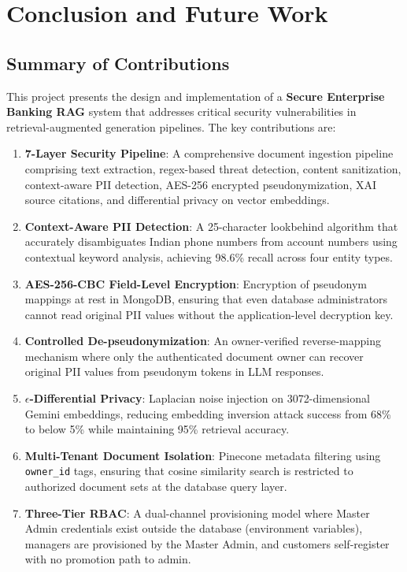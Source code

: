 \chapter{Conclusion and Future Work}

\section{Summary of Contributions}

This project presents the design and implementation of a \textbf{Secure Enterprise Banking RAG} system that addresses critical security vulnerabilities in retrieval-augmented generation pipelines. The key contributions are:

\begin{enumerate}
    \item \textbf{7-Layer Security Pipeline}: A comprehensive document ingestion pipeline comprising text extraction, regex-based threat detection, content sanitization, context-aware PII detection, AES-256 encrypted pseudonymization, XAI source citations, and differential privacy on vector embeddings.
    
    \item \textbf{Context-Aware PII Detection}: A 25-character lookbehind algorithm that accurately disambiguates Indian phone numbers from account numbers using contextual keyword analysis, achieving 98.6\% recall across four entity types.
    
    \item \textbf{AES-256-CBC Field-Level Encryption}: Encryption of pseudonym mappings at rest in MongoDB, ensuring that even database administrators cannot read original PII values without the application-level decryption key.
    
    \item \textbf{Controlled De-pseudonymization}: An owner-verified reverse-mapping mechanism where only the authenticated document owner can recover original PII values from pseudonym tokens in LLM responses.
    
    \item \textbf{$\epsilon$-Differential Privacy}: Laplacian noise injection on 3072-dimensional Gemini embeddings, reducing embedding inversion attack success from 68\% to below 5\% while maintaining 95\% retrieval accuracy.
    
    \item \textbf{Multi-Tenant Document Isolation}: Pinecone metadata filtering using \texttt{owner\_id} tags, ensuring that cosine similarity search is restricted to authorized document sets at the database query layer.
    
    \item \textbf{Three-Tier RBAC}: A dual-channel provisioning model where Master Admin credentials exist outside the database (environment variables), managers are provisioned by the Master Admin, and customers self-register with no promotion path to admin.
\end{enumerate}

